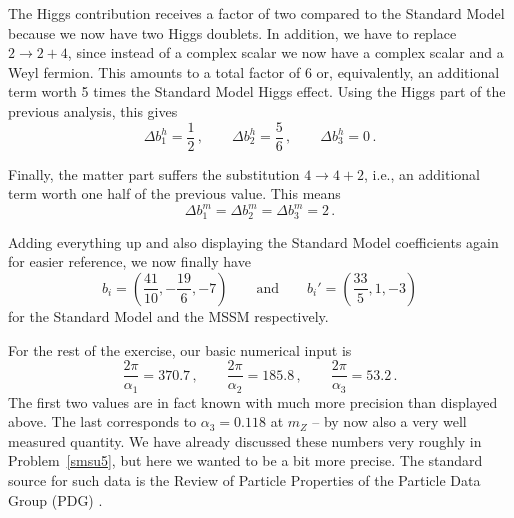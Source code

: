 \documentclass[12pt]{article}
\newcommand{\be}{\begin{equation}}
\newcommand{\ee}{\end{equation}}
\numberwithin{equation}{section}
\begin{document}
The Higgs contribution receives a factor of two compared to the Standard Model because we now have two Higgs doublets. In addition, we have to replace $2\to 2+4$, since instead of a complex scalar we now have a complex scalar and a Weyl fermion. This amounts to a total factor of 6 or, equivalently, an additional term worth 5 times the Standard Model Higgs effect. Using the Higgs part of the previous analysis, this gives
\be
\Delta b_1^h=\frac{1}{2}\,,\qquad \Delta b_2^h=\frac{5}{6}\,,\qquad \Delta b_3^h=0\,.
\ee

Finally, the matter part suffers the substitution $4\to 4+2$, i.e., an additional term worth one half of the previous value. This means
\be
\Delta b_1^m=\Delta b_2^m=\Delta b_3^m=2\,.
\ee

Adding everything up and also displaying the Standard Model coefficients again for easier reference, we now finally have
\be
b_i=\left(\frac{41}{10},-\frac{19}{6},-7\right)\qquad \mbox{and}\qquad 
b_i'=\left(\frac{33}{5},1,-3\right)
\ee
for the Standard Model and the MSSM respectively.

For the rest of the exercise, our basic numerical input is
\be
\frac{2\pi}{\alpha_1}=370.7\,,\qquad 
\frac{2\pi}{\alpha_2}=185.8\,,\qquad 
\frac{2\pi}{\alpha_3}=53.2\,.
\ee
The first two values are in fact known with much more precision than displayed above. The last corresponds to $\alpha_3=0.118$ at $m_Z$ -- by now also a very well measured quantity. We have already discussed these numbers very roughly in Problem~\ref{smsu5}, but here we wanted to be a bit more precise. The standard source for such data is the Review of Particle Properties of the Particle Data Group (PDG) \cite{Tanabashi:2018oca}.
\end{document}
